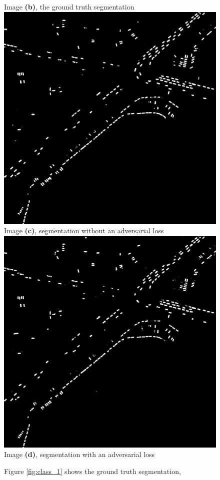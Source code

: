 \documentclass[a4paper,11pt]{article}
\begin{document}
\begin{figure}[H]
  Image \textbf{(b)}, the ground truth segmentation
\endminipage\hfill
{}
  \includegraphics[width=\linewidth]{gan_vs_class/class_4}
  Image \textbf{(c)}, segmentation without an adversarial loss
\endminipage\hfill
{}%
  \includegraphics[width=\linewidth]{gan_vs_class/gan_4}
   Image \textbf{(d)}, segmentation with an adversarial loss
\endminipage
\caption{Figure \ref{fig:class_1} shows the ground truth segmentation,}
\end{figure}
\end{document}
